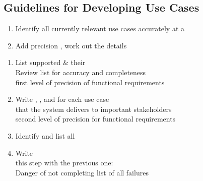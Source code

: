 \subsection{Guidelines for Developing Use Cases}
\begin{defBox}[title=In General: Proceed Incrementally]
    \begin{enumerate}
        \item Identify all currently relevant use cases accurately at a 
        \item Add precision , work out the details
    \end{enumerate}
\end{defBox}

\begin{defBox}[title=Recommended Workflow]
    \begin{enumerate}
        \item List supported  \& their \\
        Review list for accuracy and completeness\\
         first level of precision of functional requirements
        \item Write , , and  for each use case\\
         that the system delivers to important stakeholders\\
         second level of precision for functional requirements
        \item Identify and list all 
        \item Write \\
         this step with the previous one:\\
        Danger of not completing list of all failures
    \end{enumerate}
\end{defBox}

